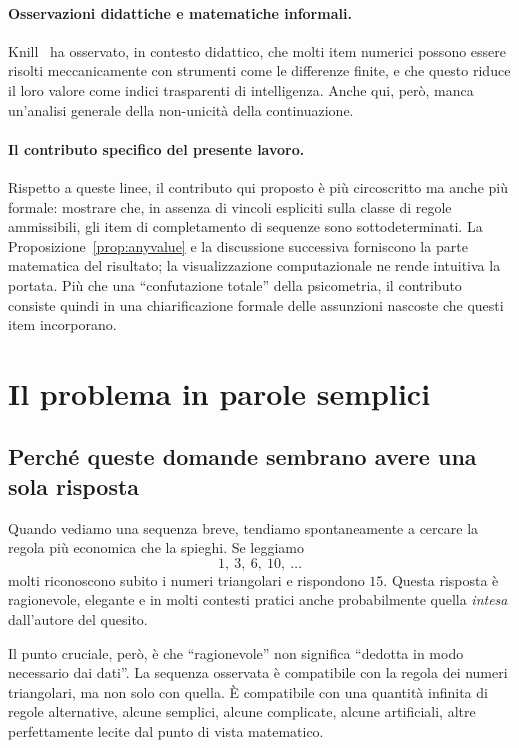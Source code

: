 \documentclass[10pt, a4paper]{article}
\theoremstyle{plain}
\theoremstyle{definition}
\theoremstyle{remark}
\begin{document}
\paragraph{Osservazioni didattiche e matematiche informali.}
Knill~\cite{knill2014} ha osservato, in contesto didattico, che molti item
numerici possono essere risolti meccanicamente con strumenti come le differenze
finite, e che questo riduce il loro valore come indici trasparenti di
intelligenza. Anche qui, però, manca un'analisi generale della non-unicità
della continuazione.

\paragraph{Il contributo specifico del presente lavoro.}
Rispetto a queste linee, il contributo qui proposto è più circoscritto ma anche
più formale: mostrare che, in assenza di vincoli espliciti sulla classe di
regole ammissibili, gli item di completamento di sequenze sono
sottodeterminati. La Proposizione~\ref{prop:anyvalue} e la discussione
successiva forniscono la parte matematica del risultato; la visualizzazione
computazionale ne rende intuitiva la portata. Più che una ``confutazione
totale'' della psicometria, il contributo consiste quindi in una chiarificazione
formale delle assunzioni nascoste che questi item incorporano.

\section{Il problema in parole semplici}
\label{sec:plain}

\subsection{Perché queste domande sembrano avere una sola risposta}

Quando vediamo una sequenza breve, tendiamo spontaneamente a cercare la regola
più economica che la spieghi. Se leggiamo
\[
1,\ 3,\ 6,\ 10,\ \dots
\]
molti riconoscono subito i numeri triangolari e rispondono $15$. Questa
risposta è ragionevole, elegante e in molti contesti pratici anche
probabilmente quella \emph{intesa} dall'autore del quesito.

Il punto cruciale, però, è che ``ragionevole'' non significa ``dedotta in modo
necessario dai dati''. La sequenza osservata è compatibile con la regola dei
numeri triangolari, ma non solo con quella. È compatibile con una quantità
infinita di regole alternative, alcune semplici, alcune complicate, alcune
artificiali, altre perfettamente lecite dal punto di vista matematico.
\end{document}
